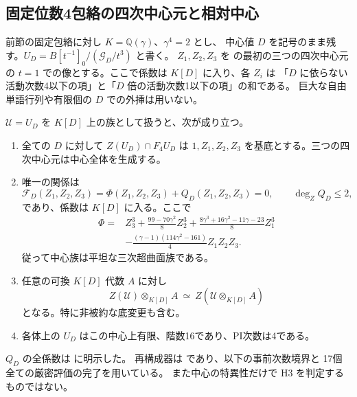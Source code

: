 \subsection{固定位数4包絡の四次中心元と相対中心}
\label{subsec:order4-explicit-center}
前節の固定包絡に対し $K=\mathbb Q(\gamma)$、$\gamma^4=2$ とし、
中心値 $D$ を記号のまま残す。$U_D=B[t^{-1}]_0/(\mathcal G_D/t^3)$ と書く。
$Z_1,Z_2,Z_3$ を  の最初の三つの四次中心元の
$t=1$ での像とする。ここで係数は $K[D]$ に入り、各 $Z_i$ は
「$D$ に依らない活動次数4以下の項」と「$D$ 倍の活動次数1以下の項」の和である。
巨大な自由単語行列や有限個の $D$ での外挿は用いない。

\begin{theorem}[全中心の三生成元と任意の底変更]
\label{thm:order4-relative-center}
$\mathcal U=U_D$ を $K[D]$ 上の族として扱うと、次が成り立つ。
\begin{enumerate}
\item 全ての $D$ に対して $Z(U_D)\cap F_4U_D$ は
$1,Z_1,Z_2,Z_3$ を基底とする。三つの四次中心元は中心全体を生成する。
\item 唯一の関係は
\[
 \mathcal F_D(Z_1,Z_2,Z_3)=\Phi(Z_1,Z_2,Z_3)+Q_D(Z_1,Z_2,Z_3)=0,
 \qquad\deg_Z Q_D\le2,
\]
であり、係数は $K[D]$ に入る。ここで
\begin{align*}
 \Phi={}&Z_3^3+\frac{99-70\gamma^2}{8}Z_2^3
 +\frac{8\gamma^3+16\gamma^2-11\gamma-23}{8}Z_1^3\\
 &-\frac{(\gamma-1)(114\gamma^2-161)}4Z_1Z_2Z_3.
\end{align*}
従って中心族は平坦な三次超曲面族である。
\item 任意の可換 $K[D]$ 代数 $A$ に対し
\[
 Z(\mathcal U)\otimes_{K[D]}A\ \simeq\ Z(\mathcal U\otimes_{K[D]}A)
\]
となる。特に非被約な底変更も含む。
\item 各体上の $U_D$ はこの中心上有限、階数16であり、PI次数は4である。
\end{enumerate}
$Q_D$ の全係数は  に明示した。
再構成器は  であり、以下の事前次数境界と
17個全ての厳密評価の完了を用いている。
また中心の特異性だけで H3 を判定するものではない。
\end{theorem}

